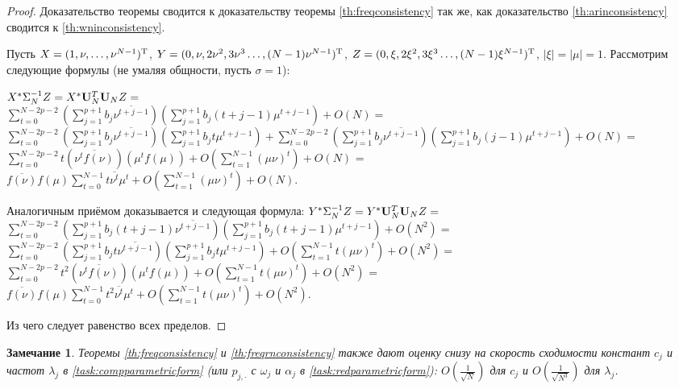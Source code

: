 \documentclass[12pt,a4paper]{article}
\newtheorem{remark}{Замечание}
\begin{document}
\begin{proof}
	Доказательство теоремы сводится к доказательству теоремы \ref{th:freqconsistency} так же, как доказательство \ref{th:arinconsistency} сводится к \ref{th:wninconsistency}.
	
	Пусть $X = (1, \nu, \ldots, \nu^{N-1})^{\mathrm{T}}$, $Y = (0, \nu, 2 \nu^2, 3 \nu^3 \ldots, (N - 1)\nu^{N-1})^{\mathrm{T}}$, $Z = (0, \xi, 2 \xi^2, 3 \xi^3 \ldots, (N - 1)\xi^{N-1})^{\mathrm{T}}$, $|\xi| = |\mu| = 1$. 
	Рассмотрим следующие формулы (не умаляя общности, пусть $\sigma = 1$):
	
	$X^* \Sigma_N^{-1} Z = X^* \mathbf{U}_N^T \mathbf{U}_N Z = $ \\
	$\sum_{t=0}^{N-{2p}-2} (\sum_{j=1}^{p+1}b_j \overline{\nu^{
	t + j - 1}}) (\sum_{j=1}^{p+1}b_j (t + j - 1) \mu^{t + j - 1}) + O(N) =$ \\ 
    $\sum_{t=0}^{N-{2p}-2} (\sum_{j=1}^{p+1}b_j \overline{\nu^{
		t + j - 1}}) (\sum_{j=1}^{p+1}b_j t \mu^{t + j - 1}) + \sum_{t=0}^{N-{2p}-2} (\sum_{j=1}^{p+1}b_j \overline{\nu^{
		t + j - 1}}) (\sum_{j=1}^{p+1}b_j (j-1) \mu^{t + j - 1}) + O(N) =$ 
	$\sum_{t=0}^{N-{2p} -2} t (\overline{\nu^t f(\nu)})(\mu^t f(\mu)) + O(\sum_{t=1}^{N-1} (\mu \nu)^t) + O(N)$ = \\
	$\overline{f(\nu)} f(\mu) \sum_{t=0}^{N-1} t \overline{\nu^t} \mu^t + O(\sum_{t=1}^{N-1} (\mu \nu)^t) + O(N)$.
	
	Аналогичным приёмом доказывается и следующая формула:
	$Y^* \Sigma_N^{-1} Z = Y^* \mathbf{U}_N^T \mathbf{U}_N Z = $ \\
	$\sum_{t=0}^{N-{2p}-2} (\sum_{j=1}^{p+1}b_j (t + j - 1) \overline{\nu^{
			t + j - 1}}) (\sum_{j=1}^{p+1}b_j (t + j - 1) \mu^{t + j - 1}) + O(N^2) =$ \\ 
	$\sum_{t=0}^{N-{2p}-2} (\sum_{j=1}^{p+1}b_j t \overline{\nu^{
			t + j - 1}}) (\sum_{j=1}^{p+1}b_j t \mu^{t + j - 1}) + O(\sum_{t=1}^{N-1} t (\mu \nu)^t) + O(N^2) =$ \\
	$\sum_{t=0}^{N-{2p} -2} t^2 (\overline{\nu^t f(\nu)})(\mu^t f(\mu)) + O(\sum_{t=1}^{N-1} t (\mu \nu)^t) + O(N^2)$ = \\
	$\overline{f(\nu)} f(\mu) \sum_{t=0}^{N-1} t^2 \overline{\nu^t} \mu^t + O(\sum_{t=1}^{N-1} t (\mu \nu)^t) + O(N^2)$.
	
	Из чего следует равенство всех пределов.
\end{proof}

\begin{remark}
	Теоремы \ref{th:freqconsistency} и \ref{th:freqrnconsistency} также дают оценку снизу на скорость сходимости констант $c_j$ и частот $\lambda_j$ в \eqref{task:compparametricform} (или $p_{j, \cdot}$ с $\omega_j$ и $\alpha_j$ в \eqref{task:redparametricform}):
	$O(\frac{1}{\sqrt{N}})$ для $c_j$ и $O(\frac{1}{\sqrt{N^3}})$ для $\lambda_j$.
\end{remark}
\end{document}
